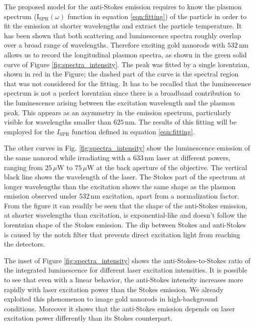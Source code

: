 \documentclass[journal=nalefd,manuscript=letter]{achemso}
\newcommand{\nm}{\ensuremath{\,\textrm{nm}}}
\newcommand{\uW}{\ensuremath{\,\mu\textrm{W}}}
\begin{document}
The proposed model for the anti-Stokes emission requires to know the plasmon
spectrum ($\textrm{I}_{\textrm{SPR}}(\omega)$ function in equation \ref{eqn:fitting}) of
the particle in order to fit the emission at shorter wavelengths and extract the
particle temperature. It has been shown that both scattering and luminescence
spectra roughly overlap over a broad range of wavelengths\cite{Yorulmaz2012}. Therefore
exciting gold nanorods with $532\nm$ allows us to record the longitudinal
plasmon spectra, as shown in the green solid curve of Figure \ref{fig:spectra_intensity}. The
peak was fitted by a single lorentzian, shown in red in the Figure; the dashed
part of the curve is the spectral region that was not considered for the
fitting. It has to be recalled that the luminescence spectrum is not a perfect
lorentzian since there is a broadband contribution to the luminescence arising
between the excitation wavelength and the plasmon peak\cite{Boyd1986}. This
appears as an asymmetry in the emission spectrum, particularly visible for
wavelengths smaller than $625\nm$. The results of this fitting will be employed
for the $I_\textrm{SPR}$ function defined in equation \ref{eqn:fitting}. 

The other curves in Fig. \ref{fig:spectra_intensity} show the luminescence emission of
the same nanorod while irradiating with a $633\nm$ laser at different powers,
ranging from $25\uW$ to $75\uW$ at the back aperture of the objective.  %
The vertical black line shows the wavelength of the laser. The Stokes part of the
spectrum at longer wavelengths than the excitation shows the same shape as the
plasmon emission observed under $532\nm$ excitation, apart from a normalization
factor. From the figure it can readily be seen that the shape of the anti-Stokes
emission, at shorter wavelengths than excitation, is exponential-like and
doesn't follow the lorentzian shape of the Stokes emission. The dip between
Stokes and anti-Stokes is caused by the notch filter that prevents direct
excitation light from reaching the detectors.

The inset of Figure \ref{fig:spectra_intensity} shows the anti-Stokes-to-Stokes ratio of
the integrated luminescence for different laser excitation intensities. It is
possible to see that even with a linear behavior, the anti-Stokes intensity
increases more rapidly with laser excitation power than the Stokes emission.
We already exploited this phenomenon to image gold nanorods in high-background
conditions\cite{Carattino2016a}. Moreover it shows that the anti-Stokes emission
depends on laser excitation power differently than its Stokes counterpart. 
\end{document}
